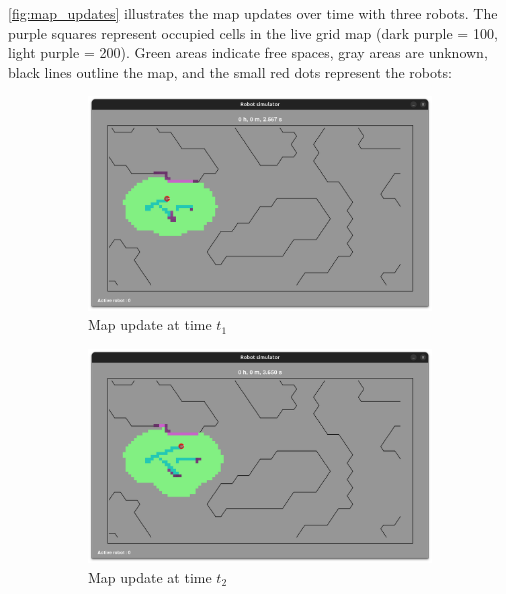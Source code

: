 \documentclass[../main.tex]{subfiles}
\begin{document}
\autoref{fig:map_updates} illustrates the map updates over time with three robots. The purple squares represent occupied cells in the live grid map (dark purple = 100, light purple = 200). Green areas indicate free spaces, gray areas are unknown, black lines outline the map, and the small red dots represent the robots:

\begin{figure}[H]
	\centering
	\begin{subfigure}{0.4\textwidth}
		\centering
		\includegraphics[width=\textwidth]{IMAGES/part5/lgm_t1.png}
		\caption{Map update at time $t_1$}
	\end{subfigure}
	\hfill
	\begin{subfigure}{0.4\textwidth}
		\centering
		\includegraphics[width=\textwidth]{IMAGES/part5/lgm_t2.png}
		\caption{Map update at time $t_2$}
	\end{subfigure}
	\vfill
	\begin{subfigure}{0.4\textwidth}
		\centering

\end{subfigure}
\end{figure}
\end{document}
